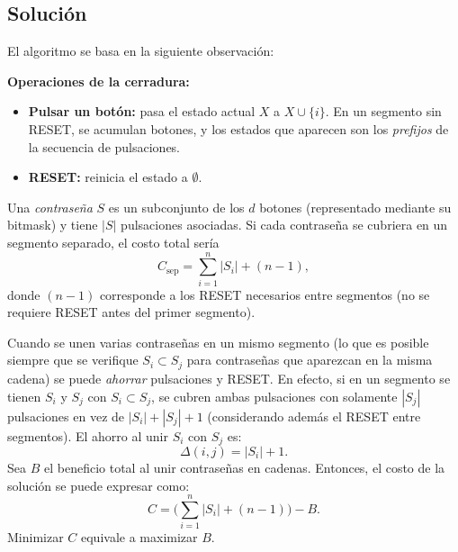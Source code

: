 ﻿\documentclass{article}
\theoremstyle{plain}
\theoremstyle{definition}
\begin{document}
\subsection{Solución}
El algoritmo se basa en la siguiente observación:

\bigskip

\textbf{Operaciones de la cerradura:}
\begin{itemize}
    \item \textbf{Pulsar un botón:} pasa el estado actual \(X\) a \(X\cup\{i\}\). En un segmento sin RESET, se acumulan botones, y los estados que aparecen son los \emph{prefijos} de la secuencia de pulsaciones.
    \item \textbf{RESET:} reinicia el estado a \(\emptyset\).
\end{itemize}

\bigskip

Una \emph{contraseña} \(S\) es un subconjunto de los \(d\) botones (representado mediante su bitmask) y tiene \(|S|\) pulsaciones asociadas. Si cada contraseña se cubriera en un segmento separado, el costo total sería
\[
C_{\text{sep}} = \sum_{i=1}^{n} |S_i| + (n-1),
\]
donde \((n-1)\) corresponde a los RESET necesarios entre segmentos (no se requiere RESET antes del primer segmento).

Cuando se unen varias contraseñas en un mismo segmento (lo que es posible siempre que se verifique \(S_i \subset S_j\) para contraseñas que aparezcan en la misma cadena) se puede \emph{ahorrar} pulsaciones y RESET. En efecto, si en un segmento se tienen \(S_i\) y \(S_j\) con \(S_i \subset S_j\), se cubren ambas pulsaciones con solamente \(|S_j|\) pulsaciones en vez de \( |S_i| + |S_j| + 1\) (considerando además el RESET entre segmentos). El ahorro al unir \(S_i\) con \(S_j\) es:
\[
\Delta(i,j)= |S_i|+1.
\]
Sea \(B\) el beneficio total al unir contraseñas en cadenas. Entonces, el costo de la solución se puede expresar como:
\[
C = \Biggl(\sum_{i=1}^{n} |S_i| + (n-1)\Biggr) - B.
\]
Minimizar \(C\) equivale a maximizar \(B\).

\bigskip
\end{document}
